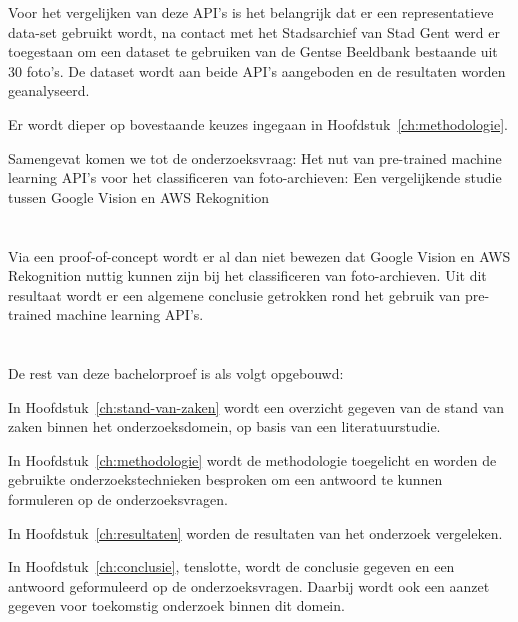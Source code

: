 Voor het vergelijken van deze API's is het belangrijk dat er een representatieve data-set gebruikt wordt, na contact met het Stadsarchief van Stad Gent werd er toegestaan om een dataset te gebruiken van de Gentse Beeldbank bestaande uit 30 foto's. De dataset wordt aan beide API's aangeboden en de resultaten worden geanalyseerd.

Er wordt dieper op bovestaande keuzes ingegaan in Hoofdstuk~\ref{ch:methodologie}.

Samengevat komen we tot de onderzoeksvraag: Het nut van pre-trained machine learning API's voor het classificeren van foto-archieven: Een vergelijkende studie tussen Google Vision en AWS Rekognition

\section{}
\label{sec:onderzoeksdoelstelling}

Via een proof-of-concept wordt er al dan niet bewezen dat Google Vision en AWS Rekognition nuttig kunnen zijn bij het classificeren van foto-archieven. Uit dit resultaat wordt er een algemene conclusie getrokken rond het gebruik van pre-trained machine learning API's.

\section{}
\label{sec:opzet-bachelorproef}


De rest van deze bachelorproef is als volgt opgebouwd:

In Hoofdstuk~\ref{ch:stand-van-zaken} wordt een overzicht gegeven van de stand van zaken binnen het onderzoeksdomein, op basis van een literatuurstudie.

In Hoofdstuk~\ref{ch:methodologie} wordt de methodologie toegelicht en worden de gebruikte onderzoekstechnieken besproken om een antwoord te kunnen formuleren op de onderzoeksvragen.

In Hoofdstuk~\ref{ch:resultaten} worden de resultaten van het onderzoek vergeleken.


In Hoofdstuk~\ref{ch:conclusie}, tenslotte, wordt de conclusie gegeven en een antwoord geformuleerd op de onderzoeksvragen. Daarbij wordt ook een aanzet gegeven voor toekomstig onderzoek binnen dit domein.